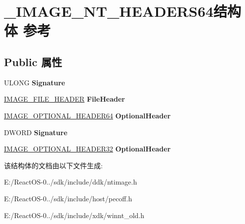 \hypertarget{struct___i_m_a_g_e___n_t___h_e_a_d_e_r_s64}{}\section{\+\_\+\+I\+M\+A\+G\+E\+\_\+\+N\+T\+\_\+\+H\+E\+A\+D\+E\+R\+S64结构体 参考}
\label{struct___i_m_a_g_e___n_t___h_e_a_d_e_r_s64}
\subsection*{Public 属性}
\begin{DoxyCompactItemize}
\item 
\mbox{\label{struct___i_m_a_g_e___n_t___h_e_a_d_e_r_s64_a846d3eb78fd95dc71db36e89269d81cb}} 
U\+L\+O\+NG {\bfseries Signature}
\item 
\mbox{\label{struct___i_m_a_g_e___n_t___h_e_a_d_e_r_s64_a90697a3d56043dee58cbf21b30363863}} 
\hyperlink{struct___i_m_a_g_e___f_i_l_e___h_e_a_d_e_r}{I\+M\+A\+G\+E\+\_\+\+F\+I\+L\+E\+\_\+\+H\+E\+A\+D\+ER} {\bfseries File\+Header}
\item 
\mbox{\label{struct___i_m_a_g_e___n_t___h_e_a_d_e_r_s64_a50eaffc01bf927048dc730c15b5ed3f1}} 
\hyperlink{struct___i_m_a_g_e___o_p_t_i_o_n_a_l___h_e_a_d_e_r64}{I\+M\+A\+G\+E\+\_\+\+O\+P\+T\+I\+O\+N\+A\+L\+\_\+\+H\+E\+A\+D\+E\+R64} {\bfseries Optional\+Header}
\item 
\mbox{\label{struct___i_m_a_g_e___n_t___h_e_a_d_e_r_s64_a846d3eb78fd95dc71db36e89269d81cb}} 
D\+W\+O\+RD {\bfseries Signature}
\item 
\mbox{\label{struct___i_m_a_g_e___n_t___h_e_a_d_e_r_s64_a5a8b26726be5b81eecba31b6fcdc637b}} 
\hyperlink{struct___i_m_a_g_e___o_p_t_i_o_n_a_l___h_e_a_d_e_r}{I\+M\+A\+G\+E\+\_\+\+O\+P\+T\+I\+O\+N\+A\+L\+\_\+\+H\+E\+A\+D\+E\+R32} {\bfseries Optional\+Header}
\end{DoxyCompactItemize}


该结构体的文档由以下文件生成\+:\begin{DoxyCompactItemize}
\item 
E\+:/\+React\+O\+S-\/0../sdk/include/ddk/ntimage.\+h\item 
E\+:/\+React\+O\+S-\/0../sdk/include/host/pecoff.\+h\item 
E\+:/\+React\+O\+S-\/0../sdk/include/xdk/winnt\+\_\+old.\+h\end{DoxyCompactItemize}
